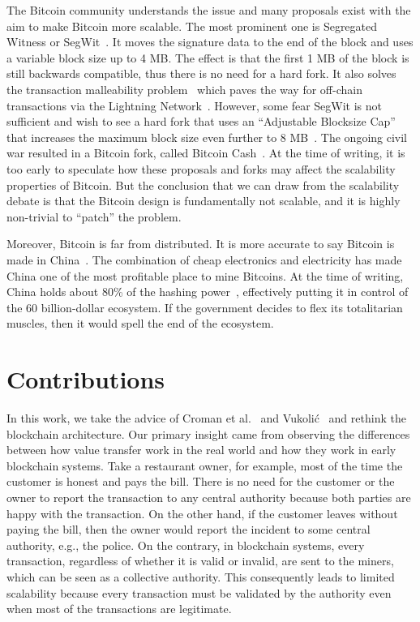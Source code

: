 The Bitcoin community understands the issue and many proposals exist with the aim to make Bitcoin more scalable.
The most prominent one is Segregated Witness or SegWit~\cite{segwit}.
It moves the signature data to the end of the block and uses a variable block size up to 4 MB.
The effect is that the first 1 MB of the block is still backwards compatible, thus there is no need for a hard fork.
It also solves the transaction malleability problem~\cite{bitcoinmalleability} which paves the way for off-chain transactions via the Lightning Network~\cite{lightningnetwork}.
However, some fear SegWit is not sufficient and wish to see a hard fork that uses an ``Adjustable Blocksize Cap'' that increases the maximum block size even further to 8 MB~\cite{bitcoincash}.
The ongoing civil war resulted in a Bitcoin fork, called Bitcoin Cash~\cite{bitcoincasharticle}.
At the time of writing, it is too early to speculate how these proposals and forks may affect the scalability properties of Bitcoin.
But the conclusion that we can draw from the scalability debate is that the Bitcoin design is fundamentally not scalable,
and it is highly non-trivial to ``patch'' the problem.

Moreover, Bitcoin is far from distributed.
It is more accurate to say Bitcoin is made in China~\cite{madeinchina}.
The combination of cheap electronics and electricity has made China one of the most profitable place to mine Bitcoins.
At the time of writing, China holds about 80\% of the hashing power~\cite{bitcoinpool},
effectively putting it in control of the 60 billion-dollar ecosystem.
If the government decides to flex its totalitarian muscles,
then it would spell the end of the ecosystem.


\section{Contributions}
In this work, we take the advice of Croman et al.~\cite{croman2016scaling} and Vukoli\'{c}~\cite{vukolic2015quest} and rethink the blockchain architecture.
Our primary insight came from observing the differences between how value transfer work in the real world and how they work in early blockchain systems.
Take a restaurant owner, for example,
most of the time the customer is honest and pays the bill.
There is no need for the customer or the owner to report the transaction to any central authority 
because both parties are happy with the transaction.
On the other hand, if the customer leaves without paying the bill,
then the owner would report the incident to some central authority, e.g., the police.
On the contrary, in blockchain systems, every transaction, regardless of whether it is valid or invalid, are sent to the miners,
which can be seen as a collective authority.
This consequently leads to limited scalability because every transaction must be validated by the authority even when most of the transactions are legitimate.

